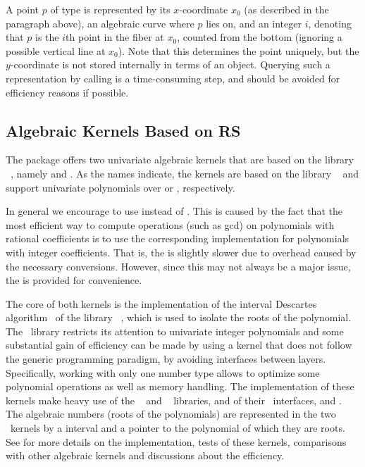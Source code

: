 A point $p$ of type  is represented
by its $x$-coordinate $x_0$ (as described in the 
paragraph above), an algebraic curve where $p$ lies on, and an
integer $i$, denoting that $p$ is the $i$th point in the fiber at $x_0$,
counted from the bottom (ignoring a possible vertical line at $x_0$).
Note that this determines the point uniquely, but the $y$-coordinate 
is not stored internally in terms of an  object.
Querying such a representation by calling  is a
time-consuming step, and should be avoided for efficiency reasons if possible.


\subsection{Algebraic Kernels Based on RS}

The package offers two univariate algebraic kernels that are based on 
the library \rs~\cite{cgal:r-rs}, namely 
and . As the names indicate, 
the kernels are based on the library \rs~\cite{cgal:r-rs} and support univariate 
polynomials over  or , respectively. 

In general we encourage to use 
instead of . This is caused by
the fact that the most efficient way to compute operations (such as gcd)
on polynomials with rational coefficients is to use the corresponding
implementation for polynomials with integer coefficients.  That is,
the  is slightly slower due to
overhead caused by the necessary conversions.  However, since this may
not always be a major issue, the 
is provided for convenience.


The core of both kernels is the implementation of the interval Descartes 
algorithm~\cite{cgal:rz-jcam-04} of the library \rs~\cite{cgal:r-rs}, 
which is used to isolate the roots of the polynomial. 
The \rs~library restricts its attention to univariate integer
polynomials and some substantial gain of efficiency can be made by using a kernel
that does not follow the generic programming paradigm, by avoiding
interfaces between layers.  Specifically, working with
only one number type allows to optimize some polynomial operations
as well as memory handling.  The implementation of these kernels
make heavy use of the \mpfr~\cite{cgal:mt-mpfr} and \mpfi~\cite{cgal:r-mpfi}
libraries, and of their \cgal\ interfaces,  and .
The algebraic numbers (roots of the polynomials) are represented
in the two \rs~kernels by a  interval and a pointer to
the polynomial of which they are roots.  See \cite{cgal:lpt-wea-09} 
for more details on the implementation, tests of these kernels,
comparisons with other algebraic kernels and discussions about the
efficiency.  


